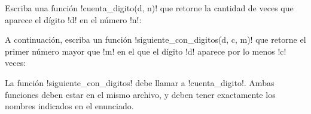 \documentclass[12pt,spanish,letterpaper]{article}
\begin{document}
  Escriba una función \li!cuenta_digito(d, n)!
  que retorne la cantidad de veces
  que aparece el dígito \li!d!
  en el número \li!n!:

  

  A continuación,
  escriba un función \li!siguiente_con_digitos(d, c, m)!
  que retorne el primer número mayor que \li!m!
  en el que el dígito \li!d! aparece por lo menos \li!c! veces:

  

  La función \li!siguiente_con_digitos!
  debe llamar a \li!cuenta_digito!.
  Ambas funciones deben estar en el mismo archivo,
  y deben tener exactamente los nombres indicados en el enunciado.
\end{document}
